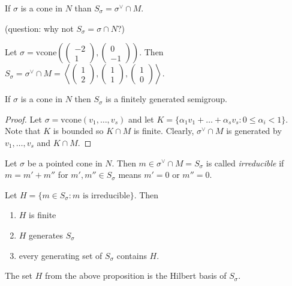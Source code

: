 \documentclass[a4paper,12pt]{amsart}
\begin{document}
\begin{Def}
If $\sigma$ is a cone in $N$ than $S_{\sigma} = \sigma^\vee \cap M$.
\end{Def}

(question: why not $S_\sigma = \sigma \cap N$?)

\begin{Eg}
Let $\sigma = \mathrm{vcone}\left(\begin{pmatrix}-2\\1\end{pmatrix}, \begin{pmatrix}0\\-1\end{pmatrix}\right)$.
Then $S_\sigma = \sigma^\vee \cap M = \left\langle \begin{pmatrix}1\\2\end{pmatrix}, \begin{pmatrix}1\\1\end{pmatrix}, \begin{pmatrix}1\\0\end{pmatrix} \right\rangle$.
\end{Eg}

\begin{Proposition}
If $\sigma$ is a cone in $N$ then $S_\sigma$ is a finitely generated semigroup.
\end{Proposition}

\begin{proof}
Let $\sigma = \mathrm{vcone}(v_1, \dots, v_s)$ and let $K = \{\alpha_1v_1 + \dots + \alpha_sv_s : 0 \le \alpha_i < 1\}$.
Note that $K$ is bounded so $K \cap M$ is finite.
Clearly, $\sigma^\vee \cap M$ is generated by $v_1, \dots, v_s$ and $K \cap M$.
\end{proof}

\begin{Def}
Let $\sigma$ be a pointed cone in $N$.
Then $m \in \sigma^\vee \cap M = S_\sigma$ is called \emph{irreducible} if $m = m' + m''$ for $m', m'' \in S_\sigma$ means $m' = 0$ or $m'' = 0$.
\end{Def}

\begin{Proposition}
Let $H = \{m \in S_\sigma : \text{$m$ is irreducible}\}$.
Then
\begin{enumerate}
\item $H$ is finite
\item $H$ generates $S_\sigma$
\item every generating set of $S_\sigma$ contains $H$.
\end{enumerate}
\end{Proposition}

The set $H$ from the above proposition is the Hilbert basis of $S_\sigma$.
\end{document}
